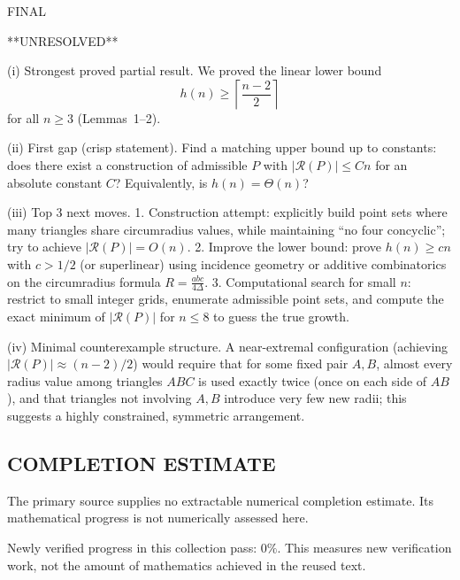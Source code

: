 FINAL

**UNRESOLVED**

(i) Strongest proved partial result.
We proved the linear lower bound
\[h(n)\ge \left\lceil\frac{n-2}{2}\right\rceil\]
for all $n\ge 3$ (Lemmas~1--2).

(ii) First gap (crisp statement).
Find a matching upper bound up to constants: does there exist a construction of admissible $P$ with $|\mathcal{R}(P)|\le Cn$ for an absolute constant $C$? Equivalently, is $h(n)=\Theta(n)$?

(iii) Top 3 next moves.
1. Construction attempt: explicitly build point sets where many triangles share circumradius values, while maintaining “no four concyclic”; try to achieve $|\mathcal{R}(P)|=O(n)$.
2. Improve the lower bound: prove $h(n)\ge c n$ with $c>1/2$ (or superlinear) using incidence geometry or additive combinatorics on the circumradius formula $R=\frac{abc}{4\Delta}$.
3. Computational search for small $n$: restrict to small integer grids, enumerate admissible point sets, and compute the exact minimum of $|\mathcal{R}(P)|$ for $n\le 8$ to guess the true growth.

(iv) Minimal counterexample structure.
A near-extremal configuration (achieving $|\mathcal{R}(P)|\approx (n-2)/2$) would require that for some fixed pair $A,B$, almost every radius value among triangles $ABC$ is used exactly twice (once on each side of $AB$), and that triangles not involving $A,B$ introduce very few new radii; this suggests a highly constrained, symmetric arrangement.



\subsection*{COMPLETION ESTIMATE}
The primary source supplies no extractable numerical completion estimate. Its mathematical progress is not numerically assessed here.

Newly verified progress in this collection pass: $0\%$. This measures new verification work, not the amount of mathematics achieved in the reused text.
